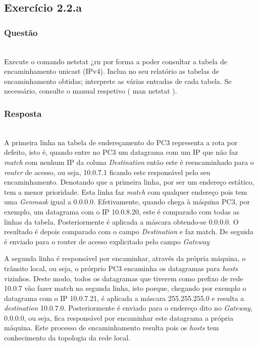 \documentclass{llncs}
\begin{document}

\subsection{Exercício 2.2.a}
\subsubsection{Questão}\rule[-10pt]{0pt}{10pt}\\

Execute o comando netstat ¿rn por forma a poder consultar a tabela de encaminhamento unicast (IPv4). Inclua no seu relatório as tabelas de encaminhamento obtidas; interprete as várias entradas de cada tabela. Se necessário, consulte o manual respetivo ( man netstat ).

\subsubsection{Resposta}\rule[-10pt]{0pt}{10pt}\\

A primeira linha na tabela de endereçamento do PC3 representa a rota por defeito, isto é, quando entre no PC3 um datagrama com um IP que não faz \textit{match} com nenhum IP da coluna \textit{Destination} então este é reencaminhado para o \textit{router} de acesso, ou seja, 10.0.7.1 ficando este responsável pelo seu encaminhamento. Denotando que a primeira linha, por ser um endereço estático, tem a menor prioridade. Esta linha faz \textit{match} com qualquer endereço pois tem uma \textit{Genmask} igual a 0.0.0.0. Efetivamente, quando chega à máquina PC3, por exemplo,  um datagrama com o IP 10.0.8.20, este é comparado com todas as linhas da tabela. Posteriormente é aplicada a máscara obtendo-se 0.0.0.0. O resultado é depois comparado com o campo \textit{Destination} e faz match. De seguida é enviado para o router de acesso explicitado pelo campo \textit{Gateway}

A segunda linha é responsável por encaminhar, através da própria máquina, o trânsito local, ou seja, o prórprio PC3 encaminha os datagramas para \textit{hosts} vizinhos. Deste modo, todos os datagramas que tiverem como prefixo de rede 10.0.7 vão fazer match na segunda linha, isto porque, chegando por exemplo o datagrama com o IP 10.0.7.21, é aplicada a máscara 255.255.255.0 e resulta a \textit{destination} 10.0.7.0. Posteriormente é enviado para o endereço dito no \textit{Gateway}, 0.0.0.0, ou seja, fica responsável por encaminhar este datagrama a própria máquina. Este processo de encaminhamento resulta pois os \textit{hosts} tem conhecimento da topologia da rede local.
\end{document}
